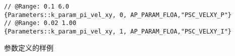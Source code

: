 \begin{listing}[!ht]
\footnotesize{
\begin{verbatim}
// @Range: 0.1 6.0
{Parameters::k_param_pi_vel_xy, 0, AP_PARAM_FLOA,"PSC_VELXY_P"}
// @Range: 0.02 1.00
{Parameters::k_param_pi_vel_xy, 1, AP_PARAM_FLOA,"PSC_VELXY_I"}
\end{verbatim}
}
\caption{参数定义的样例}
\label{lis:fix_code_example}
\end{listing}